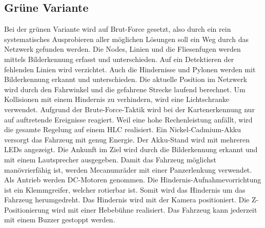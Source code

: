 \documentclass[main.tex]{subfiles} %
\begin{document}
\subsection{Grüne Variante}
Bei der grünen Variante wird auf Brut-Force gesetzt, also durch ein rein systematisches Ausprobieren aller möglichen Lösungen soll ein Weg durch das Netzwerk gefunden werden. Die Nodes, Linien und die Fliesenfugen werden mittels Bilderkennung erfasst und unterschieden. Auf ein Detektieren der fehlenden Linien wird verzichtet. Auch die Hindernisse und Pylonen werden mit Bilderkennung erkannt und unterschieden. Die aktuelle Position im Netzwerk wird durch den Fahrwinkel und die gefahrene Strecke laufend berechnet. Um Kollisionen mit einem Hindernis zu verhindern, wird eine Lichtschranke verwendet. Aufgrund der Brute-Force-Taktik wird bei der Kartenerkennung nur auf auftretende Ereignisse reagiert. Weil eine hohe Rechenleistung anfällt, wird die gesamte Regelung auf einem HLC realisiert.\newline
Ein Nickel-Cadmium-Akku versorgt das Fahrzeug mit genug Energie. Der Akku-Stand wird mit mehreren LEDs angezeigt. Die Ankunft im Ziel wird durch die Bilderkennung erkannt und mit einem Lautsprecher ausgegeben.\newline
Damit das Fahrzeug möglichst manövrierfähig ist, werden Mecanumräder mit einer Panzerlenkung verwendet. Als Antrieb werden DC-Motoren genommen. Die Hindernis-Aufnahmevorrichtung ist ein Klemmgreifer, welcher rotierbar ist. Somit wird das Hindernis um das Fahrzeug herumgedreht. Das Hindernis wird mit der Kamera positioniert. Die Z-Positionierung wird mit einer Hebebühne realisiert. Das Fahrzeug kann jederzeit mit einem Buzzer gestoppt werden.
\end{document}
